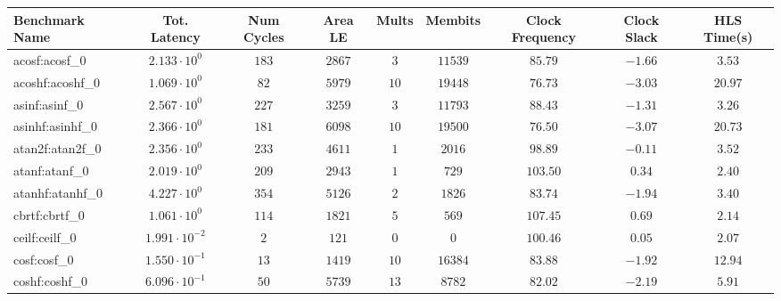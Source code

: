 \begin{tabular}{|l|c|c|c|c|c|c|c|c|}
\hline
Benchmark Name               & Tot. Latency            & Num Cycles & Area LE   & Mults   & Membits    & Clock Frequency & Clock Slack & HLS Time(s) \\
\hline
acosf:acosf\_0               & $ 2.133 \cdot 10^{0}  $ & $ 183    $ & $ 2867  $ & $ 3   $ & $ 11539  $ & $ 85.79       $ & $ -1.66   $ & $ 3.53    $ \\
acoshf:acoshf\_0             & $ 1.069 \cdot 10^{0}  $ & $ 82     $ & $ 5979  $ & $ 10  $ & $ 19448  $ & $ 76.73       $ & $ -3.03   $ & $ 20.97   $ \\
asinf:asinf\_0               & $ 2.567 \cdot 10^{0}  $ & $ 227    $ & $ 3259  $ & $ 3   $ & $ 11793  $ & $ 88.43       $ & $ -1.31   $ & $ 3.26    $ \\
asinhf:asinhf\_0             & $ 2.366 \cdot 10^{0}  $ & $ 181    $ & $ 6098  $ & $ 10  $ & $ 19500  $ & $ 76.50       $ & $ -3.07   $ & $ 20.73   $ \\
atan2f:atan2f\_0             & $ 2.356 \cdot 10^{0}  $ & $ 233    $ & $ 4611  $ & $ 1   $ & $ 2016   $ & $ 98.89       $ & $ -0.11   $ & $ 3.52    $ \\
atanf:atanf\_0               & $ 2.019 \cdot 10^{0}  $ & $ 209    $ & $ 2943  $ & $ 1   $ & $ 729    $ & $ 103.50      $ & $ 0.34    $ & $ 2.40    $ \\
atanhf:atanhf\_0             & $ 4.227 \cdot 10^{0}  $ & $ 354    $ & $ 5126  $ & $ 2   $ & $ 1826   $ & $ 83.74       $ & $ -1.94   $ & $ 3.40    $ \\
cbrtf:cbrtf\_0               & $ 1.061 \cdot 10^{0}  $ & $ 114    $ & $ 1821  $ & $ 5   $ & $ 569    $ & $ 107.45      $ & $ 0.69    $ & $ 2.14    $ \\
ceilf:ceilf\_0               & $ 1.991 \cdot 10^{-2} $ & $ 2      $ & $ 121   $ & $ 0   $ & $ 0      $ & $ 100.46      $ & $ 0.05    $ & $ 2.07    $ \\
cosf:cosf\_0                 & $ 1.550 \cdot 10^{-1} $ & $ 13     $ & $ 1419  $ & $ 10  $ & $ 16384  $ & $ 83.88       $ & $ -1.92   $ & $ 12.94   $ \\
coshf:coshf\_0               & $ 6.096 \cdot 10^{-1} $ & $ 50     $ & $ 5739  $ & $ 13  $ & $ 8782   $ & $ 82.02       $ & $ -2.19   $ & $ 5.91    $ \\

\end{tabular}

